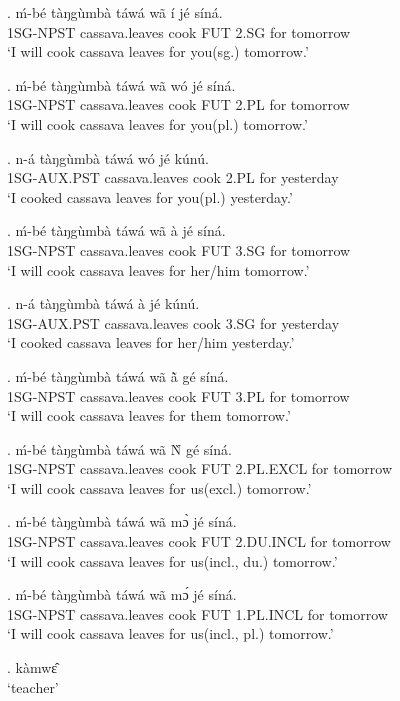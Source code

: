 \documentclass{assets/fieldnotes}
\begin{document}
\exg. ḿ-bé tàŋgùmbà táwá wã í jé síná.\\
    1SG-NPST cassava.leaves cook FUT 2.SG for tomorrow\\
    `I will cook cassava leaves for you(sg.) tomorrow.'

\exg. ḿ-bé tàŋgùmbà táwá wã wó jé síná.\\
    1SG-NPST cassava.leaves cook FUT 2.PL for tomorrow\\
    `I will cook cassava leaves for you(pl.) tomorrow.'

\exg. n-á tàŋgùmbà táwá wó jé kúnú.\\
    1SG-AUX.PST cassava.leaves cook 2.PL for yesterday\\
    `I cooked cassava leaves for you(pl.) yesterday.'

\exg. ḿ-bé tàŋgùmbà táwá wã à jé síná.\\
    1SG-NPST cassava.leaves cook FUT 3.SG for tomorrow\\
    `I will cook cassava leaves for her/him tomorrow.'

\exg. n-á tàŋgùmbà táwá à jé kúnú.\\
    1SG-AUX.PST cassava.leaves cook 3.SG for yesterday\\
    `I cooked cassava leaves for her/him yesterday.'

\exg. ḿ-bé tàŋgùmbà táwá wã à̃ gé síná.\\
    1SG-NPST cassava.leaves cook FUT 3.PL for tomorrow\\
    `I will cook cassava leaves for them tomorrow.' \label{3PL beneficiary}

\exg. ḿ-bé tàŋgùmbà táwá wã Ǹ gé síná.\\
    1SG-NPST cassava.leaves cook FUT 2.PL.EXCL for tomorrow\\
    `I will cook cassava leaves for us(excl.) tomorrow.'

\exg. ḿ-bé tàŋgùmbà táwá wã mɔ̀ jé síná.\\
    1SG-NPST cassava.leaves cook FUT 2.DU.INCL for tomorrow\\
    `I will cook cassava leaves for us(incl., du.) tomorrow.'

\exg. ḿ-bé tàŋgùmbà táwá wã mɔ́ jé síná.\\
    1SG-NPST cassava.leaves cook FUT 1.PL.INCL for tomorrow\\
    `I will cook cassava leaves for us(incl., pl.) tomorrow.'

\ex. kàmwɛ̂\\
    `teacher'
\end{document}
